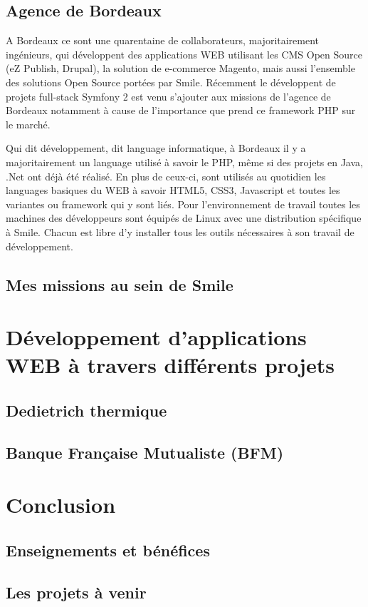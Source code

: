 \documentclass[a4paper,11pt,twoside]{report}
\begin{document}
\section{Agence de Bordeaux}
A Bordeaux ce sont une quarentaine de collaborateurs, majoritairement ingénieurs, qui développent des applications WEB utilisant les CMS Open Source (eZ Publish, Drupal), la solution de e-commerce Magento, mais aussi l’ensemble des solutions Open Source portées par Smile. Récemment le développent de projets full-stack Symfony 2 est venu s'ajouter aux missions de l'agence de Bordeaux notamment à cause de l'importance que prend ce framework PHP sur le marché.\newline

Qui dit développement, dit language informatique, à Bordeaux il y a majoritairement un language utilisé à savoir le PHP, même si des projets en Java, .Net ont déjà été réalisé. En plus de ceux-ci, sont utilisés au quotidien les languages basiques du WEB à savoir HTML5, CSS3, Javascript et toutes les variantes ou framework qui y sont liés. Pour l'environnement de travail toutes les machines des développeurs sont équipés de Linux avec une distribution spécifique à Smile. Chacun est libre d'y installer tous les outils nécessaires à son travail de développement. 
\section{Mes missions au sein de Smile}

\chapter{Développement d'applications WEB à travers différents projets}
\section{Dedietrich thermique}
\section{Banque Française Mutualiste (BFM)}

\chapter{Conclusion}
\section{Enseignements et bénéfices}
\section{Les projets à venir}
\end{document}
